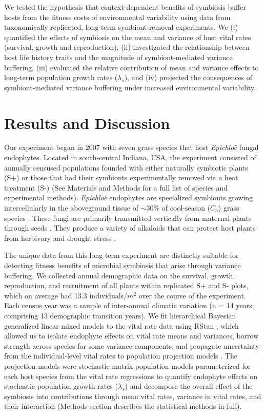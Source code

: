 \documentclass[9pt,twocolumn,twoside]{pnas-new}
\begin{document}
We tested the hypothesis that context-dependent benefits of symbiosis buffer hosts from the fitness costs of environmental variability using data from taxonomically replicated, long-term symbiont-removal experiments. 
We  (i) quantified the effects of symbiosis on the mean and variance of host vital rates (survival, growth and reproduction), (ii) investigated the relationship between host life history traits and the magnitude of symbiont-mediated variance buffering, (iii) evaluated the relative contribution of mean and variance effects to long-term population growth rates ($\lambda_s$), and (iv) projected the consequences of symbiont-mediated variance buffering under increased environmental variability.

\section*{Results and Discussion}
Our experiment began in 2007 with seven grass species that host \emph{Epichlo\"{e}} fungal endophytes. 
Located in south-central Indiana, USA, the experiment consisted of annually censused populations founded with either naturally symbiotic plants (S+) or those that had their symbionts experimentally removed via a heat treatment (S-) (See Materials and Methods for a full list of species and experimental methods).
\emph{Epichlo\"{e}} endophytes are specialized symbionts growing intercellularly in the aboveground tissue of  $\sim30$\% of cool-season ($C_{3}$) grass species \cite{leuchtmann1992systematics}.
These fungi are primarily transmitted vertically from maternal plants through seeds \cite{cheplick2009ecology}.
They produce a variety of alkaloids that can protect host plants from herbivory \cite{brem2001epichloe} and drought stress \cite{decunta2021systematic}.

The unique data from this long-term experiment are distinctly suitable for detecting fitness benefits of microbial symbiosis that arise through variance buffering. 
We collected annual demographic data on the survival, growth, reproduction, and recruitment of all plants within replicated S+ and S- plots, which on average had 13.3 individuals/$m^2$ over the course of the experiment. 
Each census year was a sample of inter-annual climatic variation (n = 14 years; comprising 13 demographic transition years).
We fit hierarchical Bayesian generalized linear mixed models to the vital rate data using RStan \cite{rstan2022}, which allowed us to isolate endophyte effects on vital rate means and variances, borrow strength across species for some variance components, and propagate uncertainty from the individual-level vital rates to population projection models \cite{elderd2016quantifying}. 
The projection models were stochastic matrix population models parameterized for each host species from the vital rate regressions to quantify endophyte effects on stochastic population growth rates ($\lambda_s$) and decompose the overall effect of the symbiosis into contributions through mean vital rates, variance in vital rates, and their interaction (Methods section describes the statistical methods in full).
\end{document}
